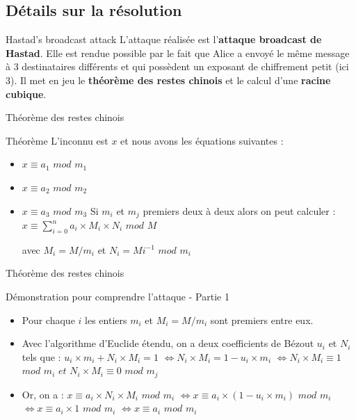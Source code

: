 \documentclass{beamer}
\begin{document}
	\subsection{Détails sur la résolution}

	\begin{frame}{Hastad's broadcast attack}
		L'attaque réalisée est l'\textbf{attaque broadcast de Hastad}. Elle est rendue possible par le fait que Alice a envoyé le même message à 3 destinataires différents et qui possèdent un exposant de chiffrement petit (ici $3$). Il met en jeu le \textbf{théorème des restes chinois} et le calcul d'une \textbf{racine cubique}.
	\end{frame}

	\begin{frame}{Théorème des restes chinois}
		\begin{block}{Théorème}
				L'inconnu est $x$ et nous avons les équations suivantes :
				\begin{itemize}
				\item $x \equiv a_1$ $mod$ $m_1$
				\item $x \equiv a_2$ $mod$ $m_2$
				\item $x \equiv a_3$ $mod$ $m_3$
				Si $m_i$ et $m_j$ premiers deux à deux alors on peut calculer : \newline
				\color{red}$x \equiv \sum \limits_{i=0}^{n}a_i \times M_i \times N_i$ $mod$ $M$ \color{black}

				avec $M_i=M / m_{i}$ et $N_i = Mi^{-1}$ $mod$ $m_i$
			\end{itemize}
		\end{block}
	\end{frame}

	\begin{frame}{Théorème des restes chinois}
	\begin{alertblock}{Démonstration pour comprendre l'attaque - Partie 1}
		\begin{itemize}
		\item Pour chaque $i$ les entiers $m_i$ et $M_i=M/m_i$ sont premiers entre eux.
		\item Avec l'algorithme d'Euclide étendu, on a deux coefficients de Bézout $u_i$ et $N_i$ tels que :
		$u_i\times m_i + N_i\times M_i = 1$ \newline $\Leftrightarrow N_i \times M_i = 1 - u_i \times m_i$ \newline $\Leftrightarrow N_i \times M_i \equiv 1$ $mod$ $m_i$ $et$ $N_i \times M_i \equiv 0$ $mod$ $m_j$
		\item Or, on a : $x \equiv a_i \times N_i \times M_i$ $mod$ $m_i$ \newline $\Leftrightarrow x \equiv a_i \times (1 - u_i \times m_i)$ $mod$ $m_i$ \newline
		$\Leftrightarrow x \equiv a_i \times 1$ $mod$ $m_i$ \newline
		$\Leftrightarrow x \equiv a_i$ $mod$ $m_i$
		\end{itemize}
	\end{alertblock}
	\end{frame}
\end{document}
